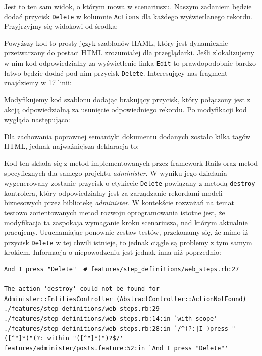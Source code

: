   Jest to ten sam widok, o którym mowa w scenariuszu. Naszym zadaniem będzie dodać przycisk \verb+Delete+ w kolumnie \verb+Actions+ dla każdego wyświetlanego rekordu. Przyjrzyjmy się widokowi od środka:
  
  
  
  Powyższy kod to prosty język szablonów HAML, który jest dynamicznie przetwarzany do postaci HTML zrozumiałej dla przeglądarki. Jeśli zlokalizujemy w nim kod odpowiedzialny za wyświetlenie linka \texttt{Edit} to prawdopodobnie bardzo łatwo będzie dodać pod nim przycisk \texttt{Delete}. Interesujący nas fragment znajdziemy w 17 linii:
  
  
  
  Modyfikujemy kod szablonu dodając brakujący przycisk, który połączony jest z akcją odpowiedzialną za usunięcie odpowiedniego rekordu. Po modyfikacji kod wygląda następująco:
  
  
  
  Dla zachowania poprawnej semantyki dokumentu dodanych zostało kilka tagów HTML, jednak najważniejsza deklaracja to:
  
  
  
  Kod ten składa się z metod implementowanych przez framework Rails oraz metod specyficznych dla samego projektu \emph{administer}. W wyniku jego działania wygenerowany zostanie przycisk o etykiecie \texttt{Delete} powiązany z metodą \texttt{destroy} kontrolera, który odpowiedzialny jest za zarządzanie rekordami modeli biznesowych przez bibliotekę \emph{administer}. W kontekście rozważań na temat testowo zorientowanych metod rozwoju oprogramowania istotne jest, że modyfikacja ta zaspokaja wymaganie kroku scenariusza, nad którym aktualnie pracujemy. Uruchamiając ponownie zestaw testów, przekonamy się, że mimo iż przycisk \texttt{Delete} w tej chwili istnieje, to jednak ciągle są problemy z tym samym krokiem. Informacja o niepowodzeniu jest jednak inna niż poprzednio:
  
\begin{lstlisting}
And I press "Delete"  # features/step_definitions/web_steps.rb:27

The action 'destroy' could not be found for Administer::EntitiesController (AbstractController::ActionNotFound)
./features/step_definitions/web_steps.rb:29
./features/step_definitions/web_steps.rb:14:in `with_scope'
./features/step_definitions/web_steps.rb:28:in `/^(?:|I )press "([^"]*)"(?: within "([^"]*)")?$/'
features/administer/posts.feature:52:in `And I press "Delete"'
\end{lstlisting}
  
